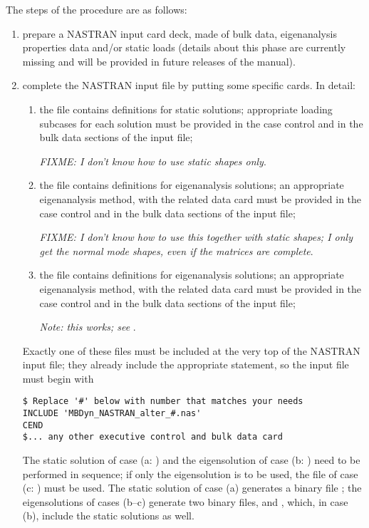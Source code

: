 The steps of the procedure are as follows:
\begin{enumerate} %

\item prepare a NASTRAN input card deck, made of bulk data,
eigenanalysis properties data and/or static loads (details about 
this phase are currently missing and will be provided in future 
releases of the manual).

\item complete the NASTRAN input file by putting some specific
 cards.
In detail:
\begin{enumerate}
\item the file  contains
	 definitions for static solutions; appropriate
	loading subcases for each solution must be provided
	in the case control and in the bulk data sections
	of the input file;

	\emph{FIXME: I don't know how to use static shapes only}.

\item the file  contains
	 definitions for eigenanalysis solutions;
	an appropriate eigenanalysis method, with the related
	data card must be provided in the case control 
	and in the bulk data sections of the input file;

	\emph{FIXME: I don't know how to use this together
		with static shapes; I only get the normal mode shapes,
		even if the matrices are complete}.

\item the file  contains
	 definitions for eigenanalysis solutions;
	an appropriate eigenanalysis method, with the related
	data card must be provided in the case control 
	and in the bulk data sections of the input file;

	\emph{Note: this works; see} .

\end{enumerate}
Exactly one of these files must be included at the very top 
of the NASTRAN input file;
they already include the appropriate  statement, so the
input file must begin with
\begin{verbatim}
$ Replace '#' below with number that matches your needs
INCLUDE 'MBDyn_NASTRAN_alter_#.nas'
CEND
$... any other executive control and bulk data card
\end{verbatim}
The static solution of case (a: ) and the eigensolution
of case (b: ) need to be performed in sequence; 
if only the eigensolution is to be used, the  file 
of case (c: ) must be used.
The static solution of case (a) generates a binary file ;
the eigensolutions of cases (b--c) generate two binary files, 
 and , which, in case (b), include
the static solutions as well.



\end{enumerate}
